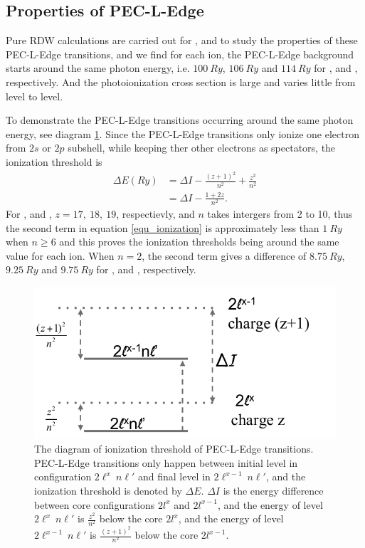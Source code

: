 \subsection{Properties of PEC-L-Edge}
\label{section_propertie_pec_l_edge}
Pure RDW calculations are carried out for ,  and  to study the properties of these PEC-L-Edge transitions, and we find for each ion, the PEC-L-Edge background starts around the same photon energy, i.e. $100~Ry$, $106~Ry$ and $114~Ry$ for  ,   and , respectively. And the photoionization cross section is large and varies little from level to level.

To demonstrate the PEC-L-Edge transitions occurring around the same photon energy, see diagram \ref{fig_fe17_fe18_fe19_thresholds}. Since the PEC-L-Edge transitions only ionize one electron from $2s$ or $2p$ subshell, while keeping ther other electrons as spectators, the ionization threshold is 
\begin{align}
\label{equ_ionization}
\Delta E (Ry)&= \Delta I - \frac{(z+1)^2}{n^2} + \frac{z^2}{n^2} \nonumber  \\
 			   &= \Delta I - \frac{1+2z}{n^2}.
\end{align}
For ,  and , $z = 17,~18,~19$, respectievly, and $n$ takes intergers from 2 to 10, thus the second term in equation \ref{equ_ionization} is approximately less than $1~Ry$ when $n\geq6$ and this proves the ionization thresholds being around the same value for each ion. When $n=2$, the second term gives a difference of $8.75~Ry$, $9.25~Ry$ and $9.75~Ry$ for  ,  and , respectively.

\begin{figure}
	\centering
	\includegraphics[width=.9\textwidth]{figures_5/ionization_energy}	
	\caption{The diagram of ionization threshold of PEC-L-Edge transitions. PEC-L-Edge transitions only happen between initial level in configuration $2\ell^x~n\ell'$ and final level in $2\ell^{x-1}~n\ell'$, and the ionization threshold is denoted by $\Delta E$. $\Delta I$ is the energy difference between core configurations $2l^x$ and $2l^{x-1}$, and the energy of level $2\ell^x~n\ell'$ is $\frac{z^2}{n^2}$ below the core  $2l^x$, and the energy of level $2\ell^{x-1}~n\ell'$ is $\frac{(z+1)^2}{n^2}$ below the core  $2l^{x-1}$.}
	\label{fig_fe17_fe18_fe19_thresholds}
\end{figure}

